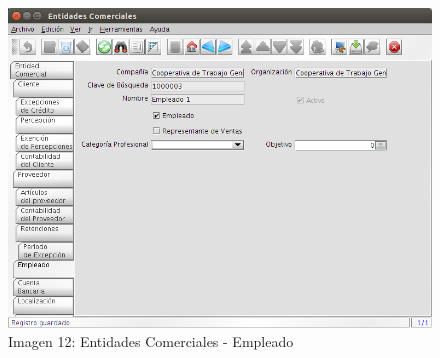 \documentclass[letterpaper,10pt,spanish]{sphinxmanual}
\begin{document}
\begin{figure}[htbp]
\centering
\capstart

\includegraphics{ly_emp.png}
\caption{Imagen 12: Entidades Comerciales - Empleado}\end{figure}
\end{document}
